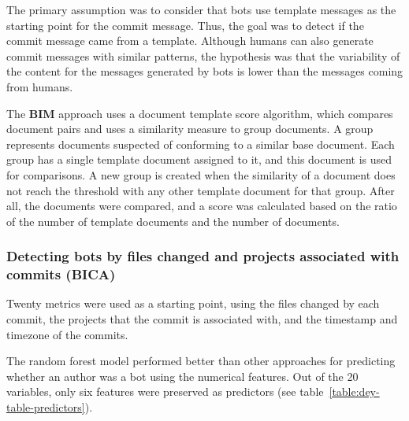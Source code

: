 \documentclass[a4paper, 12pt]{book}
\begin{document}
The primary assumption was to consider that bots use template messages as the starting point for the commit message. Thus, the goal was to detect if the commit message came from a template. Although humans can also generate commit messages with similar patterns, the hypothesis was that the variability of the content for the messages generated by bots is lower than the messages coming from humans.

The \textbf{BIM} approach uses a document template score algorithm, which compares document pairs and uses a similarity measure to group documents. A group represents documents suspected of conforming to a similar base document. Each group has a single template document assigned to it, and this document is used for comparisons. A new group is created when the similarity of a document does not reach the threshold with any other template document for that group. After all, the documents were compared, and a score was calculated based on the ratio of the number of template documents and the number of documents. 

\subsubsection{Detecting bots by files changed and projects associated with commits (BICA)}
\label{sssec:dey-bica}

Twenty metrics were used as a starting point, using the files changed by each commit, the projects that the commit is associated with, and the timestamp and timezone of the commits.

The random forest model performed better than other approaches for predicting whether an author was a bot using the numerical features. Out of the 20 variables, only six features were preserved as predictors (see table~\ref{table:dey-table-predictors}).
\end{document}
